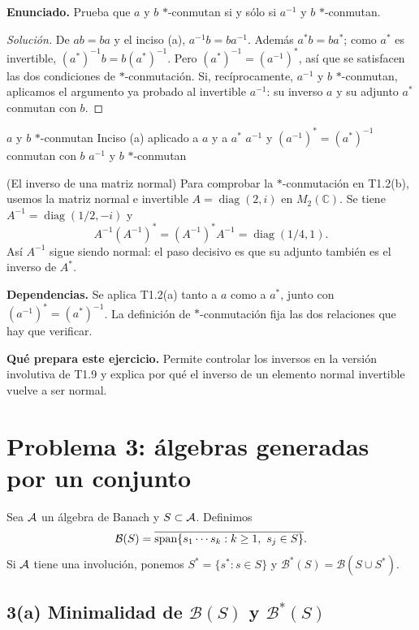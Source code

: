 \noindent\textbf{Enunciado.} Prueba que $a$ y $b$ $*$-conmutan si y sólo si $a^{-1}$ y $b$ $*$-conmutan.

\begin{proof}[Solución]
De $ab=ba$ y el inciso (a), $a^{-1}b=ba^{-1}$. Además $a^*b=ba^*$; como $a^*$ es invertible,
$(a^*)^{-1}b=b(a^*)^{-1}$. Pero $(a^*)^{-1}=(a^{-1})^*$, así que se satisfacen las dos
condiciones de $*$-conmutación. Si, recíprocamente, $a^{-1}$ y $b$ $*$-conmutan, aplicamos el
argumento ya probado al invertible $a^{-1}$: su inverso $a$ y su adjunto $a^*$ conmutan con $b$.
\end{proof}

\proofdiagram
{$a$ y $b$ $*$-conmutan}
{Inciso (a) aplicado a $a$ y a $a^*$}
{$a^{-1}$ y $(a^{-1})^*=(a^*)^{-1}$ conmutan con $b$}
{$a^{-1}$ y $b$ $*$-conmutan}

\begin{cthejemplo}{(El inverso de una matriz normal)}
Para comprobar la $*$-conmutación en T1.2(b), usemos la matriz normal e invertible
$A=\operatorname{diag}(2,i)$ en $M_2(\mathbb C)$.
Se tiene $A^{-1}=\operatorname{diag}(1/2,-i)$ y
\[
 A^{-1}(A^{-1})^*=(A^{-1})^*A^{-1}=\operatorname{diag}(1/4,1).
\]
Así $A^{-1}$ sigue siendo normal: el paso decisivo es que su adjunto también es el inverso de $A^*$.
\end{cthejemplo}

\noindent\textbf{Dependencias.} Se aplica T1.2(a) tanto a $a$ como a $a^*$, junto con $(a^{-1})^*=(a^*)^{-1}$. La definición de $*$-conmutación fija las dos relaciones que hay que verificar.

\noindent\textbf{Qué prepara este ejercicio.} Permite controlar los inversos en la versión involutiva de T1.9 y explica por qué el inverso de un elemento normal invertible vuelve a ser normal.

\section{Problema 3: álgebras generadas por un conjunto}

Sea $\mathcal A$ un álgebra de Banach y $S\subset\mathcal A$. Definimos
\[
\mathcal B(S)=\overline{\operatorname{span}\{s_1\cdots s_k:k\ge1,\ s_j\in S\}}.
\]
Si $\mathcal A$ tiene una involución, ponemos $S^*=\{s^*:s\in S\}$ y
$\mathcal B^*(S)=\mathcal B(S\cup S^*)$.

\subsection*{3(a) Minimalidad de $\mathcal B(S)$ y $\mathcal B^*(S)$}

